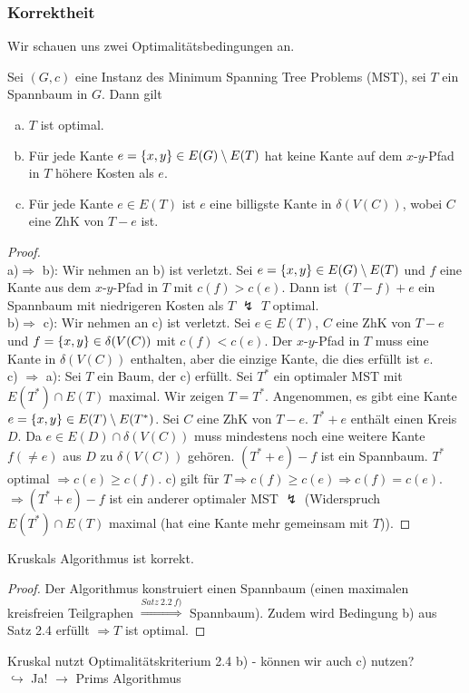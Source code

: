 \subsubsection*{Korrektheit}
Wir schauen uns zwei Optimalitätsbedingungen an.	
\begin{satz}
	Sei $(G,c)$ eine Instanz des Minimum Spanning Tree Problems (MST), sei $T$ ein Spannbaum in $G$. Dann gilt
	\begin{enumerate}[a)]
		\item $T$ ist optimal.
		\item Für jede Kante $e=\{x,y\} \in E(G)\setminus E(T)$ hat keine Kante auf dem $x$-$y$-Pfad in $T$ höhere Kosten als $e$.
		\item Für jede Kante $e\in E(T)$ ist $e$ eine billigste Kante in $\delta(V(C))$, wobei $C$ eine ZhK von $T-e$ ist.
	\end{enumerate}
\end{satz}
\begin{proof}~\\
	a)$\Rightarrow$ b): Wir nehmen an b) ist verletzt. Sei $e=\{x,y\} \in E(G)\setminus E(T)$ und $f$ eine Kante aus dem $x$-$y$-Pfad in $T$ mit $c(f) > c(e)$. Dann ist $(T-f)+e$ ein Spannbaum mit niedrigeren Kosten als $T$ $\lightning$ $T$ optimal.\\
	b)$\Rightarrow$ c): Wir nehmen an c) ist verletzt. Sei $e\in E(T)$, $C$ eine ZhK von $T-e$ und $f=\{x,y\} \in \delta(V(C))$ mit $c(f) < c(e)$. Der $x$-$y$-Pfad in $T$ muss eine Kante in $\delta(V(C))$ enthalten, aber die einzige Kante, die dies erfüllt ist $e$.\\
	c) $\Rightarrow$ a): Sei $T$ ein Baum, der c) erfüllt. Sei $T^*$ ein optimaler MST mit $E(T^*)\cap E(T)$ maximal. Wir zeigen $T=T^*$. Angenommen, es gibt eine Kante $e=\{x,y\} \in E(T)\setminus E(T^*)$. Sei $C$ eine ZhK von $T-e$. $T^*+e$ enthält einen Kreis $D$. Da $e\in E(D)\cap \delta(V(C))$ muss mindestens noch eine weitere Kante $f (\neq e)$ aus $D$ zu $\delta(V(C))$ gehören. $(T^*+e)-f$ ist ein Spannbaum. $T^*$ optimal $\Rightarrow c(e)\ge c(f)$. c) gilt für $T \Rightarrow c(f)\ge c(e)\Rightarrow c(f) = c(e)$. $\Rightarrow (T^*+e)-f$ ist ein anderer optimaler MST $\lightning$ (Widerspruch $E(T^*)\cap E(T)$ maximal (hat eine Kante mehr gemeinsam mit $T$)).
\end{proof}
\begin{satz}
	Kruskals Algorithmus ist korrekt.
\end{satz}
\begin{proof}
	Der Algorithmus konstruiert einen Spannbaum (einen maximalen kreisfreien Teilgraphen $\overset{Satz~2.2~f)}{\Rightarrow}$ Spannbaum). Zudem wird Bedingung b) aus Satz 2.4 erfüllt $\Rightarrow T$ ist optimal.
\end{proof}
Kruskal nutzt Optimalitätskriterium 2.4 b) - können wir auch c) nutzen?\\
\hspace*{10pt}$\hookrightarrow$ Ja! $\to$ Prims Algorithmus
